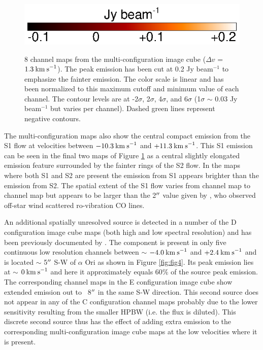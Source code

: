 \documentclass[iop]{emulateapj}
\begin{document}
\begin{figure}[hbt!]
{         }
\includegraphics[trim=0pt 20pt 0pt 5pt]{f11.ps}
\caption{8 channel maps from the multi-configuration image cube ($\Delta v$ = $1.3\>{\rm km\>s}^{-1}$). The peak emission has been cut at 0.2 Jy beam${{}^{-1}}$ to emphasize the fainter emission. The color scale is linear and has been normalized to this maximum cutoff and minimum value of each channel. The contour levels are at -2$\sigma$, 2$\sigma$, 4$\sigma$, and 6$\sigma$ (1$\sigma$ $\sim$ 0.03 Jy beam$^{-1}$ but varies per channel). Dashed green lines represent negative contours.}
\label{fig:fig3}
\end{figure}

The multi-configuration maps also show the central compact emission from the S1 flow at velocities between $-10.3\>{\rm km\>s}^{-1}$ and $+11.3\>{\rm km\>s}^{-1}$. This S1 emission can be seen in the final two maps of Figure \ref{fig:fig3} as a central slightly elongated emission feature surrounded by the fainter rings of the S2 flow. In the maps where both S1 and S2 are present the emission from S1 appears brighter than the emission from S2. The spatial extent of the S1 flow varies from channel map to channel map but appears to be larger than the 2$\mbox{$^{\prime\prime}$}$ value given by \cite{2009AJ....137.3558S}, who observed off-star wind scattered ro-vibration CO lines. 

An additional spatially unresolved source is detected in a number of the D configuration image cube maps (both high and low spectral resolution) and has been previously documented by \citet{2009AIPC.1094..868H}. The component is present in only five continuous low resolution channels between $\sim$ $-4.0\>{\rm km\>s}^{-1}$ and $+2.4\>{\rm km\>s}^{-1}$ and is located $\sim$ 5$\mbox{$^{\prime\prime}$}$ S-W of $\alpha$ Ori as shown in Figure \ref{fig:fig4}. Its peak emission lies at $\sim$ $0\>{\rm km\>s}^{-1}$ and here it approximately equals 60$\%$ of the source peak emission. The corresponding channel maps in the E configuration image cube show extended emission out to ~8$\mbox{$^{\prime\prime}$}$ in the same S-W direction. This second source does not appear in any of the C configuration channel maps probably due to the lower sensitivity resulting from the smaller HPBW (i.e. the flux is diluted). This discrete second source thus has the effect of adding extra emission to the corresponding multi-configuration image cube maps at the low velocities where it is present.
\end{document}
